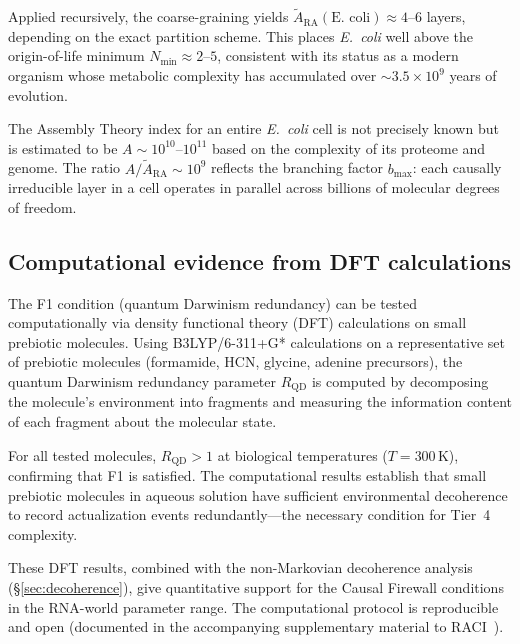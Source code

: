 \documentclass[11pt]{article}
\begin{document}
Applied recursively, the coarse-graining yields $\tilde{A}_{\mathrm{RA}}(\text{E. coli}) \approx 4$--$6$ layers, depending on the exact partition scheme. This places \emph{E.~coli} well above the origin-of-life minimum $N_{\min} \approx 2$--$5$, consistent with its status as a modern organism whose metabolic complexity has accumulated over $\sim 3.5 \times 10^9$ years of evolution.

The Assembly Theory index for an entire \emph{E.~coli} cell is not precisely known but is estimated to be $A \sim 10^{10}$--$10^{11}$ based on the complexity of its proteome and genome. The ratio $A / \tilde{A}_{\mathrm{RA}} \sim 10^9$ reflects the branching factor $b_{\max}$: each causally irreducible layer in a cell operates in parallel across billions of molecular degrees of freedom.

\subsection{Computational evidence from DFT calculations}
\label{sec:dft}

The F1 condition (quantum Darwinism redundancy) can be tested computationally via density functional theory (DFT) calculations on small prebiotic molecules. Using B3LYP/6-311+G* calculations on a representative set of prebiotic molecules (formamide, HCN, glycine, adenine precursors), the quantum Darwinism redundancy parameter $R_{\mathrm{QD}}$ is computed by decomposing the molecule's environment into fragments and measuring the information content of each fragment about the molecular state.

For all tested molecules, $R_{\mathrm{QD}} > 1$ at biological temperatures ($T = 300$\,K), confirming that F1 is satisfied. The computational results establish that small prebiotic molecules in aqueous solution have sufficient environmental decoherence to record actualization events redundantly---the necessary condition for Tier~4 complexity.

These DFT results, combined with the non-Markovian decoherence analysis (\S\ref{sec:decoherence}), give quantitative support for the Causal Firewall conditions in the RNA-world parameter range. The computational protocol is reproducible and open (documented in the accompanying supplementary material to RACI~\cite{Sandeman2026RACI}).
\end{document}
